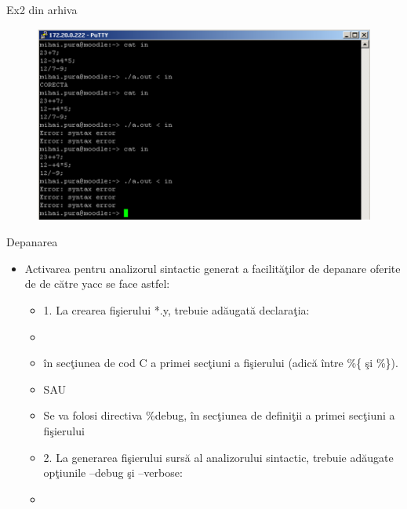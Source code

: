 \documentclass[pdf]{beamer}
\begin{document}
\begin{frame}{Ex2 din arhiva}
\begin{figure}
	\includegraphics[width=\linewidth]{imgYacc20.png}
	\label{fig:schema20}
\end{figure}
\end{frame}



\begin{frame}{Depanarea}
\begin{itemize}
	\item
	Activarea pentru analizorul sintactic generat a facilităţilor de depanare oferite de de către yacc se face astfel:
	
	\begin{itemize}
		\item<cir@1->
		1. La crearea fişierului *.y, trebuie adăugată declaraţia:

		\item[]

		\item[]
		în secţiunea de cod C a primei secţiuni a fişierului (adică între \%\{ şi \%\}).

		\item[]
		SAU

		\item[]
		\hspace{1cm}Se va folosi directiva {\color{red}\%debug}, în secţiunea de definiţii a primei secţiuni a fişierului

		\item<cir@1->
		2. La generarea fişierului sursă al analizorului sintactic, trebuie adăugate opţiunile {\color{red}--debug} şi {\color{red}--verbose}:

		\item[]

	\end{itemize}


\end{itemize}
\end{frame}
\end{document}
